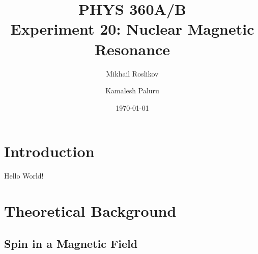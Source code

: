 \documentclass{article}
\title{PHYS 360A/B \\ Experiment 20: Nuclear Magnetic Resonance}
\author{Mikhail Roslikov \and Kamalesh Paluru}
\date{\today}
\begin{document}
\maketitle

\newpage

\tableofcontents

\newpage

\begin{abstract}
\end{abstract}

\newpage

\section{Introduction}\label{sec:introduction}
Hello World!

\newpage

\section{Theoretical Background}\label{sec:theoretical-background}

\subsection{Spin in a Magnetic Field}\label{subsec:spin-in-magnetic-field}
\end{document}
